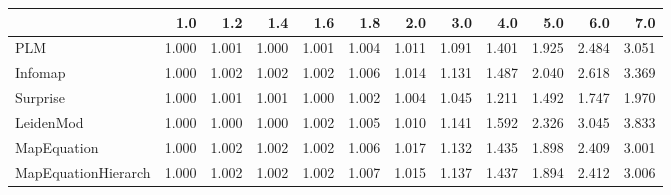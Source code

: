\begin{tabular}{lrrrrrrrrrrr}
\toprule
{} &   1.0 &   1.2 &   1.4 &   1.6 &   1.8 &   2.0 &   3.0 &   4.0 &   5.0 &   6.0 &   7.0 \\
\midrule
PLM                 & 1.000 & 1.001 & 1.000 & 1.001 & 1.004 & 1.011 & 1.091 & 1.401 & 1.925 & 2.484 & 3.051 \\
Infomap             & 1.000 & 1.002 & 1.002 & 1.002 & 1.006 & 1.014 & 1.131 & 1.487 & 2.040 & 2.618 & 3.369 \\
Surprise            & 1.000 & 1.001 & 1.001 & 1.000 & 1.002 & 1.004 & 1.045 & 1.211 & 1.492 & 1.747 & 1.970 \\
LeidenMod           & 1.000 & 1.000 & 1.000 & 1.002 & 1.005 & 1.010 & 1.141 & 1.592 & 2.326 & 3.045 & 3.833 \\
MapEquation         & 1.000 & 1.002 & 1.002 & 1.002 & 1.006 & 1.017 & 1.132 & 1.435 & 1.898 & 2.409 & 3.001 \\
MapEquationHierarch & 1.000 & 1.002 & 1.002 & 1.002 & 1.007 & 1.015 & 1.137 & 1.437 & 1.894 & 2.412 & 3.006 \\
\bottomrule
\end{tabular}
